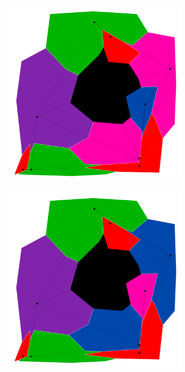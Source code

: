 \documentclass{article}
\begin{document}
\begin{figure}[h!]
\begin{subfigure}{0.18\textwidth}
				\caption{}
				\label{high_c2}
			\end{subfigure}
			\;
			\begin{subfigure}{0.18\textwidth}
				\centering
				\includegraphics[width=\textwidth]{images/sequences/mac_backtracking/bt_mac_I00016}
				\caption{}
				\label{high_c3}
			\end{subfigure}
			\;
			\begin{subfigure}{0.18\textwidth}
				\centering
				\includegraphics[width=\textwidth]{images/sequences/mac_backtracking/bt_mac_I00017}

\end{subfigure}
\end{figure}
\end{document}
